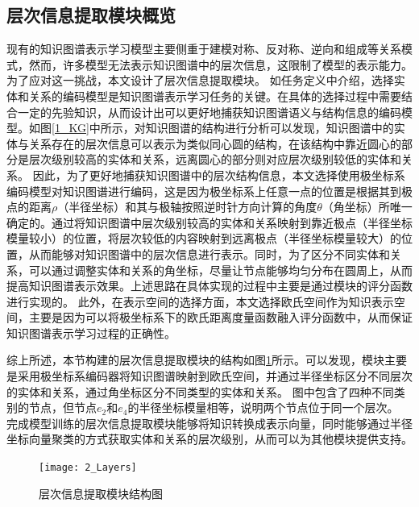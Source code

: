 \documentclass[algorithmlist, AutoFakeBold, AutoFakeSlant, figurelist, tablelist, nomlist, engineering]{seuthesix}
\begin{document}
\subsection{层次信息提取模块概览}
现有的知识图谱表示学习模型主要侧重于建模对称、反对称、逆向和组成等关系模式，然而，许多模型无法表示知识图谱中的层次信息，这限制了模型的表示能力。为了应对这一挑战，本文设计了层次信息提取模块。
如任务定义中介绍，选择实体和关系的编码模型是知识图谱表示学习任务的关键。在具体的选择过程中需要结合一定的先验知识，从而设计出可以更好地捕获知识图谱语义与结构信息的编码模型。如图\ref{1_KG}中所示，对知识图谱的结构进行分析可以发现，知识图谱中的实体与关系存在的层次信息可以表示为类似同心圆的结构，在该结构中靠近圆心的部分是层次级别较高的实体和关系，远离圆心的部分则对应层次级别较低的实体和关系。
因此，为了更好地捕获知识图谱中的层次结构信息，本文选择使用极坐标系编码模型对知识图谱进行编码，这是因为极坐标系上任意一点的位置是根据其到极点的距离$\rho$（半径坐标）和其与极轴按照逆时针方向计算的角度$\theta$（角坐标）所唯一确定的。通过将知识图谱中层次级别较高的实体和关系映射到靠近极点（半径坐标模量较小）的位置，将层次较低的内容映射到远离极点（半径坐标模量较大）的位置，从而能够对知识图谱中的层次信息进行表示。同时，为了区分不同实体和关系，可以通过调整实体和关系的角坐标，尽量让节点能够均匀分布在圆周上，从而提高知识图谱表示效果。上述思路在具体实现的过程中主要是通过模块的评分函数进行实现的。
此外，在表示空间的选择方面，本文选择欧氏空间作为知识表示空间，主要是因为可以将极坐标系下的欧氏距离度量函数融入评分函数中，从而保证知识图谱表示学习过程的正确性。

综上所述，本节构建的层次信息提取模块的结构如图\ref{2_Layers}所示。可以发现，模块主要是采用极坐标系编码器将知识图谱映射到欧氏空间，并通过半径坐标区分不同层次的实体和关系，通过角坐标区分不同类型的实体和关系。
图中包含了四种不同类别的节点，但节点$e_2$和$e_4$的半径坐标模量相等，说明两个节点位于同一个层次。
完成模型训练的层次信息提取模块能够将知识转换成表示向量，同时能够通过半径坐标向量聚类的方式获取实体和关系的层次级别，从而可以为其他模块提供支持。
\begin{figure}
  \centering
  \texttt{[image: 2\_Layers]}
  \caption{层次信息提取模块结构图}
  \label{2_Layers}
\end{figure}
\end{document}
